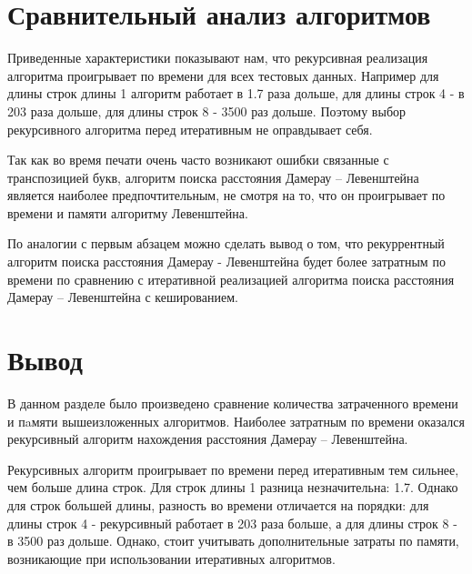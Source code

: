     \clearpage
    
        
    \section{Сравнительный анализ алгоритмов}
    
        Приведенные характеристики показывают нам, что рекурсивная реализация алгоритма проигрывает по времени для всех тестовых данных. Например для длины строк длины 1 алгоритм работает в 1.7 раза дольше, для длины строк 4 - в 203 раза дольше, для длины строк 8 - 3500 раз дольше. Поэтому выбор рекурсивного алгоритма перед итеративным не оправдывает себя.
        
        Так как во время печати очень часто возникают ошибки связанные с транспозицией букв, алгоритм поиска расстояния Дамерау – Левенштейна является наиболее предпочтительным, не смотря на то, что он проигрывает по времени и памяти алгоритму Левенштейна.
        
        По аналогии с первым абзацем можно сделать вывод о том, что рекуррентный алгоритм поиска расстояния Дамерау - Левенштейна будет более затратным по времени по сравнению с итеративной реализацией алгоритма поиска расстояния Дамерау – Левенштейна с кешированием.
    
    \section*{Вывод}
    
        В данном разделе было произведено сравнение количества затраченного времени и пaмяти вышеизложенных алгоритмов. Наиболее затратным по времени оказался рекурсивный алгоритм нахождения расстояния Дамерау – Левенштейна.
        
        Рекурсивных алгоритм проигрывает по времени перед итеративным тем сильнее, чем больше длина строк. Для строк длины 1 разница незначительна: 1.7. Однако для строк большей длины, разность во времени отличается на порядки: для длины строк 4 - рекурсивный работает в 203 раза больше, а для длины строк 8 - в 3500 раз дольше. Однако, стоит учитывать дополнительные затраты по памяти, возникающие при использовании итеративных алгоритмов.